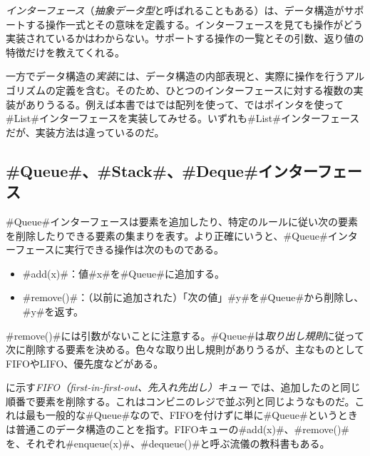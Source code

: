 \emph{インターフェース}（\emph{抽象データ型}と呼ばれることもある）は、データ構造がサポートする操作一式とその意味を定義する。インターフェースを見ても操作がどう実装されているかはわからない。サポートする操作の一覧とその引数、返り値の特徴だけを教えてくれる。 %

一方でデータ構造の\emph{実装}には、データ構造の内部表現と、実際に操作を行うアルゴリズムの定義を含む。そのため、ひとつのインターフェースに対する複数の実装がありうるる。例えば本書ではでは配列を使って、ではポインタを使って#List#インターフェースを実装してみせる。いずれも#List#インターフェースだが、実装方法は違っているのだ。

\subsection{#Queue#、#Stack#、#Deque#インターフェース}

#Queue#インターフェースは要素を追加したり、特定のルールに従い次の要素を削除したりできる要素の集まりを表す。より正確にいうと、#Queue#インターフェースに実行できる操作は次のものである。

\begin{itemize}
  \item #add(x)#：値#x#を#Queue#に追加する。
  \item #remove()#：（以前に追加された）「次の値」#y#を#Queue#から削除し、#y#を返す。
\end{itemize}

#remove()#には引数がないことに注意する。#Queue#は\emph{取り出し規則}に従って次に削除する要素を決める。色々な取り出し規則がありうるが、主なものとしてFIFOやLIFO、優先度などがある。 %

に示す\emph{FIFO（first-in-first-out、先入れ先出し）キュー} では、追加したのと同じ順番で要素を削除する。これはコンビニのレジで並ぶ列と同じようなものだ。これは最も一般的な#Queue#なので、FIFOを付けずに単に#Queue#というときは普通このデータ構造のことを指す。FIFOキューの#add(x)#、#remove()#を、それぞれ#enqueue(x)#、#dequeue()#と呼ぶ流儀の教科書もある。

